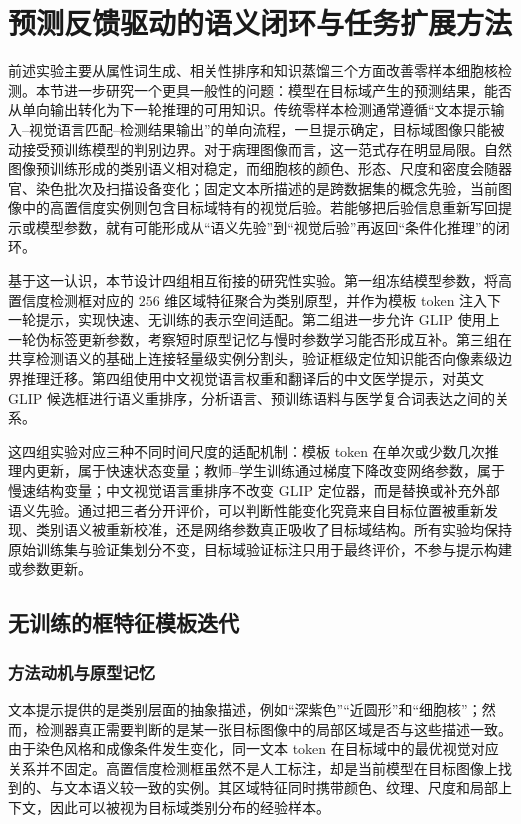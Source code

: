 \section{预测反馈驱动的语义闭环与任务扩展方法}

前述实验主要从属性词生成、相关性排序和知识蒸馏三个方面改善零样本细胞核检测。本节进一步研究一个更具一般性的问题：模型在目标域产生的预测结果，能否从单向输出转化为下一轮推理的可用知识。传统零样本检测通常遵循“文本提示输入--视觉语言匹配--检测结果输出”的单向流程，一旦提示确定，目标域图像只能被动接受预训练模型的判别边界。对于病理图像而言，这一范式存在明显局限。自然图像预训练形成的类别语义相对稳定，而细胞核的颜色、形态、尺度和密度会随器官、染色批次及扫描设备变化；固定文本所描述的是跨数据集的概念先验，当前图像中的高置信度实例则包含目标域特有的视觉后验。若能够把后验信息重新写回提示或模型参数，就有可能形成从“语义先验”到“视觉后验”再返回“条件化推理”的闭环。

基于这一认识，本节设计四组相互衔接的研究性实验。第一组冻结模型参数，将高置信度检测框对应的 $256$ 维区域特征聚合为类别原型，并作为模板 token 注入下一轮提示，实现快速、无训练的表示空间适配。第二组进一步允许 GLIP 使用上一轮伪标签更新参数，考察短时原型记忆与慢时参数学习能否形成互补。第三组在共享检测语义的基础上连接轻量级实例分割头，验证框级定位知识能否向像素级边界推理迁移。第四组使用中文视觉语言权重和翻译后的中文医学提示，对英文 GLIP 候选框进行语义重排序，分析语言、预训练语料与医学复合词表达之间的关系。

这四组实验对应三种不同时间尺度的适配机制：模板 token 在单次或少数几次推理内更新，属于快速状态变量；教师--学生训练通过梯度下降改变网络参数，属于慢速结构变量；中文视觉语言重排序不改变 GLIP 定位器，而是替换或补充外部语义先验。通过把三者分开评价，可以判断性能变化究竟来自目标位置被重新发现、类别语义被重新校准，还是网络参数真正吸收了目标域结构。所有实验均保持原始训练集与验证集划分不变，目标域验证标注只用于最终评价，不参与提示构建或参数更新。

\subsection{无训练的框特征模板迭代}

\subsubsection{方法动机与原型记忆}

文本提示提供的是类别层面的抽象描述，例如“深紫色”“近圆形”和“细胞核”；然而，检测器真正需要判断的是某一张目标图像中的局部区域是否与这些描述一致。由于染色风格和成像条件发生变化，同一文本 token 在目标域中的最优视觉对应关系并不固定。高置信度检测框虽然不是人工标注，却是当前模型在目标图像上找到的、与文本语义较一致的实例。其区域特征同时携带颜色、纹理、尺度和局部上下文，因此可以被视为目标域类别分布的经验样本。

